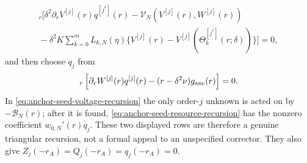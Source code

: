 \begin{lemma}
\begin{multline}
 [\delta^j]_r\biggl[
 \delta^2\partial_rV^{[j]}(r)q^{[j^\flat]}(r)
 -\mathscr V_N(V^{[j]}(r),W^{[j]}(r))\\
 {}-\delta^2K\sum_{k=0}^mL_{k,N}(\eta)
 \{V^{[j]}(r)-V^{[j]}(\Theta_k^{[j^\flat]}(r;\delta))\}
 \biggr]=0,                                          \label{eq:anchor-seed-voltage-recursion}
\end{multline}
and then choose \(q_j\) from
\begin{equation}
 [\delta^j]_r\left[
 \partial_rW^{[j]}(r)q^{[j]}(r)
 -(r-\delta^2\nu)g_{\rm anc}(r)
 \right]=0.                                          \label{eq:anchor-seed-resource-recursion}
\end{equation}
In \cref{eq:anchor-seed-voltage-recursion} the only order-\(j\) unknown is
acted on by \(-\mathscr B_N(r)\); after it is found,
\cref{eq:anchor-seed-resource-recursion} has the nonzero coefficient
\(w_{0,N}'(r)q_j\).  These two displayed rows are therefore a genuine
triangular recursion, not a formal appeal to an unspecified corrector.
They also give \(Z_j(-r_A)=Q_j(-r_A)=q_j(-r_A)=0\).


\end{lemma}
